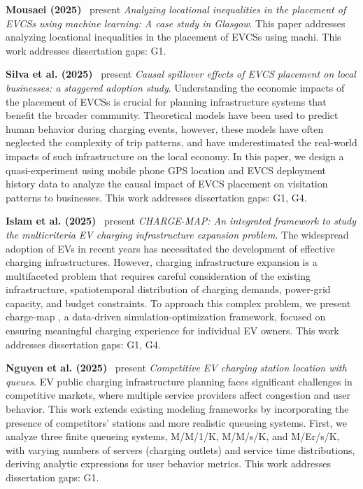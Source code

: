 \documentclass[letterpaper, 12pt, oneside, doublespacing]{Thesis}
\begin{document}
\noindent \textbf{Mousaei (2025)}~\cite{analyzing_locational_2025} present \textit{Analyzing locational inequalities in the placement of EVCSs using machine learning: A case study in Glasgow}. This paper addresses analyzing locational inequalities in the placement of EVCSs using machi. This work addresses dissertation gaps: G1.



\noindent \textbf{Silva et al. (2025)}~\cite{causal_spillover_2025} present \textit{Causal spillover effects of EVCS placement on local businesses: a staggered adoption study}. Understanding the economic impacts of the placement of EVCSs is crucial for planning infrastructure systems that benefit the broader community. Theoretical models have been used to predict human behavior during charging events, however, these models have often neglected the complexity of trip patterns, and have underestimated the real-world impacts of such infrastructure on the local economy. In this paper, we design a quasi-experiment using mobile phone GPS location and EVCS deployment history data to analyze the causal impact of EVCS placement on visitation patterns to businesses. This work addresses dissertation gaps: G1, G4.



\noindent \textbf{Islam et al. (2025)}~\cite{charge-map_an_2025} present \textit{CHARGE-MAP: An integrated framework to study the multicriteria EV charging infrastructure expansion problem}. The widespread adoption of EVs in recent years has necessitated the development of effective charging infrastructures. However, charging infrastructure expansion is a multifaceted problem that requires careful consideration of the existing infrastructure, spatiotemporal distribution of charging demands, power-grid capacity, and budget constraints. To approach this complex problem, we present charge-map , a data-driven simulation-optimization framework, focused on ensuring meaningful charging experience for individual EV owners. This work addresses dissertation gaps: G1, G4.



\noindent \textbf{Nguyen et al. (2025)}~\cite{competitive_ev_2025} present \textit{Competitive EV charging station location with queues}. EV public charging infrastructure planning faces significant challenges in competitive markets, where multiple service providers affect congestion and user behavior. This work extends existing modeling frameworks by incorporating the presence of competitors' stations and more realistic queueing systems. First, we analyze three finite queueing systems, M/M/1/K, M/M/s/K, and M/Er/s/K, with varying numbers of servers (charging outlets) and service time distributions, deriving analytic expressions for user behavior metrics. This work addresses dissertation gaps: G1.
\end{document}

